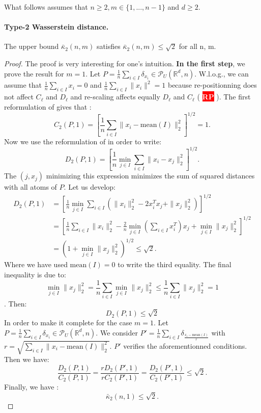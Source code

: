 \documentclass{amsart}
\newcommand{\nb}[3]{
		{\colorbox{#2}{\bfseries\sffamily\tiny\textcolor{white}{#1}}}
		{\textcolor{#2}{\text{$\blacktriangleright$}{\textcolor{#2}{#3}}\text{$\blacktriangleleft$}}}}
\newcommand{\rp}[1]{\nb{RP}{red}{#1}}
\newcommand{\RR}{\mathbb{R}}
\begin{document}
What follows assumes that $n\geq2, m\in\{1,...,n-1\}$ and $d\geq2.$
\paragraph{\textbf{Type-2 Wasserstein distance.}}
\begin{theorem}
    The upper bound $\bar\kappa_2\left(n,m\right)$ satisfies $\bar\kappa_2\left(n,m\right)\leq \sqrt{2}$ for all n, m.
\end{theorem}
\begin{proof} 
    The proof is very interesting for one's intuition. \textbf{In the first step}, we prove the result for $m=1$. Let $P=\frac{1}{n}\sum_{i\in I}\delta_{x_i}\in\mathcal{P}_U\left(\RR^d,n\right)$. W.l.o.g., we can assume that $\frac{1}{n}\sum_{i\in I}x_i=0$ and $\frac{1}{n}\sum_{i\in I}\lVert x_i\rVert^2=1$ because re-positionning does not affect $C_\ell$ and $D_\ell$ and re-scaling affects equally $D_\ell$ and $C_\ell$ (\rp{refaire un appendice propre sur cela}).
    \newline
    The first reformulation of  gives that :
    $$
    C_2\left(P,1\right)=\left[\frac{1}{n}\sum_{i\in I}\lVert x_i-\text{mean}(I)\rVert_2^2\right]^{1/2}=1.
    $$
    Now we use the reformulation of  in order to write:
    $$
    D_2\left(P,1\right)=\left[\frac{1}{n}\min_{j\in I}\sum_{i\in I}\lVert x_i-x_j\rVert^2_2\right]^{1/2}.
    $$
    The $\left(j, x_j\right)$ minimizing this expression minimizes the sum of squared distances with all atoms of $P$. Let us develop:
    \begin{align*}
    D_2\left(P,1\right)&=\left[\frac{1}{n}\min_{j\in I}\sum_{i\in I}\left(\rVert x_i\rVert^2_2-2x_i^Tx_j+\rVert x_j\rVert^2_2\right)\right]^{1/2}\\&=\left[\frac{1}{n}\sum_{i\in I}\lVert x_i\rVert_2^2-\frac{2}{n}\min_{j\in I}\left(\sum_{i\in I}x_i^T\right)x_j+\min_{j\in I}\lVert x_j\rVert^2_2\right]^{1/2} \\&=\left(1+\min_{j\in I}\lVert x_j\rVert^2_2\right)^{1/2}\leq\sqrt{2}.
    \end{align*}
Where we have used $\text{mean}(I)=0$ to write the third equality. The final inequality is due to: $$\min_{j\in I}\lVert x_j\rVert^2_2=\frac{1}{n}\sum_{i\in I}\min_{j\in I}\lVert x_j\rVert^2_2\leq \frac{1}{n}\sum_{i\in I}\lVert x_j\rVert^2_2=1$$. Then: $$D_2\left(P,1\right)\leq\sqrt{2}$$
In order to make it complete for the case $m=1$. Let $P=\frac{1}{n}\sum_{i\in I}\delta_{x_i}\in\mathcal{P}_U\left(\RR^d,n\right)$. We consider $P'=\frac{1}{n}\sum_{i\in I}\delta_{\frac{x_i-\text{mean}(I)}{r}}$ with $r=\sqrt{\sum_{i\in I}\rVert x_i-\text{mean}(I)\lVert^2_2}$. $P'$ verifies the aforementionned conditions. Then we have: 
$$
\frac{D_2\left(P,1\right)}{C_2\left(P,1\right)}=\frac{rD_2\left(P',1\right)}{rC_2\left(P',1\right)}=\frac{D_2\left(P',1\right)}{C_2\left(P',1\right)}\leq \sqrt{2}.
$$
Finally, we have : $$\bar\kappa_2\left(n,1\right)\leq\sqrt{2}.$$
\newline


\end{proof}
\end{document}
